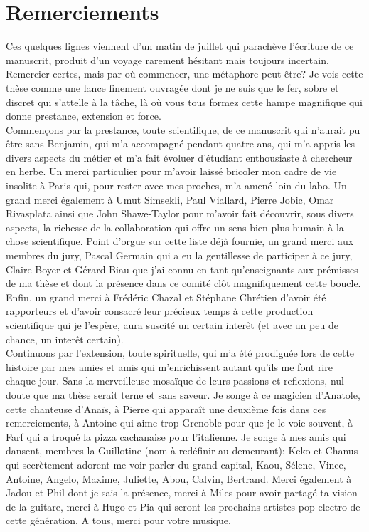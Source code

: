 \section*{Remerciements}

Ces quelques lignes viennent d'un matin de juillet qui parachève l'écriture de ce manuscrit, produit d'un voyage rarement hésitant mais toujours incertain.  
Remercier certes, mais par où commencer, une métaphore peut être? Je vois cette thèse comme une lance finement ouvragée dont je ne suis que le fer, sobre et discret qui s'attelle à la tâche, là où vous tous formez cette hampe magnifique qui donne prestance, extension et force.\\
Commençons par la prestance, toute scientifique, de ce manuscrit qui n'aurait pu être sans Benjamin, qui m'a accompagné pendant quatre ans, qui m'a appris les divers aspects du métier et m'a fait évoluer d'étudiant enthousiaste à chercheur en herbe. Un merci particulier pour m'avoir laissé bricoler mon cadre de vie insolite à Paris qui, pour rester avec mes proches, m'a amené loin du labo. Un grand merci également à Umut Simsekli, Paul Viallard, Pierre Jobic, Omar Rivasplata ainsi que John Shawe-Taylor pour m'avoir fait découvrir, sous divers aspects, la richesse de la collaboration qui offre un sens bien plus humain à la chose scientifique. Point d'orgue sur cette liste déjà fournie, un grand merci aux membres du jury, Pascal Germain qui a eu la gentillesse de participer à ce jury, Claire Boyer et Gérard Biau que j'ai connu en tant qu'enseignants aux prémisses de ma thèse et dont la présence dans ce comité clôt magnifiquement cette boucle. Enfin, un grand merci à Frédéric Chazal et Stéphane Chrétien d'avoir été rapporteurs et d'avoir consacré leur précieux temps à cette production scientifique qui je l'espère, aura suscité un certain interêt (et avec un peu de chance, un interêt certain).\\
Continuons par l'extension, toute spirituelle, qui m'a été prodiguée lors de cette histoire par mes amies et amis qui m'enrichissent autant qu'ils me font rire chaque jour. Sans la merveilleuse mosaïque de leurs passions et reflexions, nul doute que ma thèse serait terne et sans saveur. Je songe à ce magicien d'Anatole, cette chanteuse d'Anaïs, à Pierre qui apparaît une deuxième fois dans ces remerciements, à Antoine qui aime trop Grenoble pour que je le voie souvent, à Farf qui a troqué la pizza cachanaise pour l'italienne. Je songe à mes amis qui dansent, membres la Guillotine (nom à redéfinir au demeurant): Keko et Chanus qui secrètement adorent me voir parler du grand capital, Kaou, Sélene, Vince, Antoine, Angelo, Maxime, Juliette, Abou, Calvin, Bertrand. Merci également à Jadou et Phil dont je sais la présence, merci à Miles pour avoir partagé ta vision de la guitare, merci à Hugo et Pia qui seront les prochains artistes pop-electro de cette génération. A tous, merci pour votre musique. 
